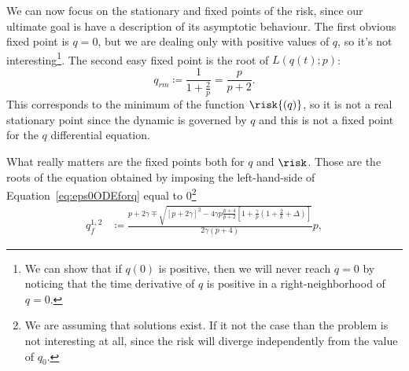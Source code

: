 We can now focus on the stationary and fixed points of the risk,
since our ultimate goal is have a description of its asymptotic behaviour.
The first obvious fixed point is \(q=0\), but we are dealing only with positive values of \(q\),
so it's not interesting\footnote{
  We can show that if \(q{(0)}\) is positive, then we will never reach \(q=0\)
  by noticing that the time derivative of \(q\) is positive 
  in a right-neighborhood of \(q=0\).
}.
The second easy fixed point is the root of \(L{(q{(t)};p)}\):
\[q_{rm} \coloneqq \frac{1}{1+\frac2p} = \frac{p}{p+2}.\]
This corresponds to the minimum of the function \(\risk{(q)}\),
so it is not a real stationary point since the dynamic is governed by \(q\)
and this is not a fixed point for the \(q\) differential equation.

What really matters are the fixed points both for \(q\) and \(\risk\). 
Those are the roots of the equation obtained by imposing the left-hand-side 
of Equation~\eqref{eq:eps0ODEforq} equal to 0\footnote{
  We are assuming that solutions exist.
  If it not the case than the problem is not interesting at all,
  since the risk will diverge independently from the value of \(q_0\).
}
\begin{equation}\begin{split}
  \displaystyle
  q_f^{1,2} &\coloneqq 
    \frac{p+2\gamma \mp
                \sqrt{\left[p+2\gamma\right]^2-
                      4\gamma p\frac{p+4}{p+2}
                        \left[1+\frac{\gamma}{p}\left(1+\frac2k+\Delta\right)\right]}}
                  {2\gamma\left(p+4\right)}p,
\end{split}\end{equation}

